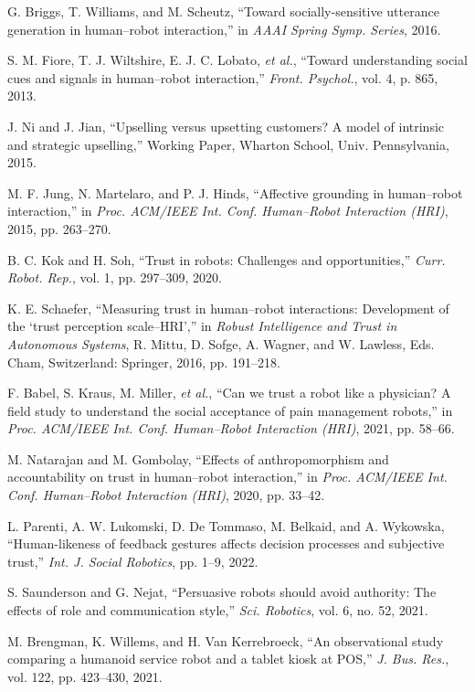 \documentclass[conference]{IEEEtran}
\begin{document}
\begin{thebibliography}{35}
 G. Briggs, T. Williams, and M. Scheutz, “Toward socially-sensitive utterance generation in human–robot interaction,” in \textit{AAAI Spring Symp. Series}, 2016.

 S. M. Fiore, T. J. Wiltshire, E. J. C. Lobato, \textit{et al.}, “Toward understanding social cues and signals in human–robot interaction,” \textit{Front. Psychol.}, vol. 4, p. 865, 2013.

 J. Ni and J. Jian, “Upselling versus upsetting customers? A model of intrinsic and strategic upselling,” Working Paper, Wharton School, Univ. Pennsylvania, 2015.

 M. F. Jung, N. Martelaro, and P. J. Hinds, “Affective grounding in human–robot interaction,” in \textit{Proc. ACM/IEEE Int. Conf. Human–Robot Interaction (HRI)}, 2015, pp. 263–270.

 B. C. Kok and H. Soh, “Trust in robots: Challenges and opportunities,” \textit{Curr. Robot. Rep.}, vol. 1, pp. 297–309, 2020.

 K. E. Schaefer, “Measuring trust in human–robot interactions: Development of the ‘trust perception scale–HRI’,” in \textit{Robust Intelligence and Trust in Autonomous Systems}, R. Mittu, D. Sofge, A. Wagner, and W. Lawless, Eds. Cham, Switzerland: Springer, 2016, pp. 191–218.

 F. Babel, S. Kraus, M. Miller, \textit{et al.}, “Can we trust a robot like a physician? A field study to understand the social acceptance of pain management robots,” in \textit{Proc. ACM/IEEE Int. Conf. Human–Robot Interaction (HRI)}, 2021, pp. 58–66.

 M. Natarajan and M. Gombolay, “Effects of anthropomorphism and accountability on trust in human–robot interaction,” in \textit{Proc. ACM/IEEE Int. Conf. Human–Robot Interaction (HRI)}, 2020, pp. 33–42.

 L. Parenti, A. W. Lukomski, D. De Tommaso, M. Belkaid, and A. Wykowska, “Human-likeness of feedback gestures affects decision processes and subjective trust,” \textit{Int. J. Social Robotics}, pp. 1–9, 2022.

 S. Saunderson and G. Nejat, “Persuasive robots should avoid authority: The effects of role and communication style,” \textit{Sci. Robotics}, vol. 6, no. 52, 2021.

 M. Brengman, K. Willems, and H. Van Kerrebroeck, “An observational study comparing a humanoid service robot and a tablet kiosk at POS,” \textit{J. Bus. Res.}, vol. 122, pp. 423–430, 2021.


\end{thebibliography}
\end{document}
